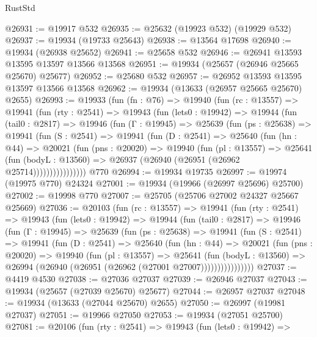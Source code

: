 \begin{lexlean}{RustStd}
\begin{coremodule}
@26931 := @19917 @532
@26935 := @25632 (@19923 @532) (@19929 @532)
@26937 := @19934 (@19733 @25643)
@26938 := @13564 @17698
@26940 := @19934 (@26938 @25652)
@26941 := @25658 @532
@26946 := @26941 @13593 @13595 @13597 @13566 @13568
@26951 := @19934 (@25657 (@26946 @25665 @25670) @25677)
@26952 := @25680 @532
@26957 := @26952 @13593 @13595 @13597 @13566 @13568
@26962 := @19934 (@13633 (@26957 @25665 @25670) @2655)
@26993 := @19933
    (fun (fn : @76) =>
    @19940
      (fun (rc : @13557) =>
      @19941
        (fun (rty : @2541) =>
        @19943
          (fun (lets0 : @19942) =>
          @19944
            (fun (tail0 : @2817) =>
            @19946
              (fun (Γ : @19945) =>
              @25639
                (fun (ps : @25638) =>
                @19941
                  (fun (S : @2541) =>
                  @19941
                    (fun (D : @2541) =>
                    @25640
                      (fun (hn : @44) =>
                      @20021
                        (fun (pns : @20020) =>
                        @19940
                          (fun (pl : @13557) =>
                          @25641
                            (fun (bodyL : @13560) =>
                            @26937 (@26940 (@26951 (@26962 @25714))))))))))))))))
    @770
@26994 := @19934 @19735
@26997 := @19974 (@19975 @770) @24324
@27001 := @19934 (@19966 (@26997 @25696) @25700)
@27002 := @19998 @770
@27007 := @25705 (@25706 @27002 @24327 @25667 @25669)
@27036 := @20103
    (fun (rc : @13557) =>
    @19941
      (fun (rty : @2541) =>
      @19943
        (fun (lets0 : @19942) =>
        @19944
          (fun (tail0 : @2817) =>
          @19946
            (fun (Γ : @19945) =>
            @25639
              (fun (ps : @25638) =>
              @19941
                (fun (S : @2541) =>
                @19941
                  (fun (D : @2541) =>
                  @25640
                    (fun (hn : @44) =>
                    @20021
                      (fun (pns : @20020) =>
                      @19940
                        (fun (pl : @13557) =>
                        @25641
                          (fun (bodyL : @13560) =>
                          @26994 (@26940 (@26951 (@26962 (@27001 @27007))))))))))))))))
@27037 := @4419 @4530
@27038 := @27036 @27037
@27039 := @26946 @27037
@27043 := @19934 (@25657 (@27039 @25670) @25677)
@27044 := @26957 @27037
@27048 := @19934 (@13633 (@27044 @25670) @2655)
@27050 := @26997 (@19981 @27037)
@27051 := @19966 @27050
@27053 := @19934 (@27051 @25700)
@27081 := @20106
    (fun (rty : @2541) =>
    @19943
      (fun (lets0 : @19942) =>

\end{coremodule}
\end{lexlean}
